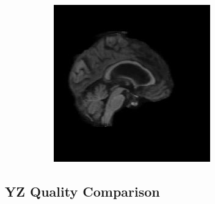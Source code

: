 \documentclass[12pt, fleqn, titlepage]{article}
\newcommand\skipperer{0.45pt}
\begin{document}
\begin{figure}[H]
\begin{subfigure}[b]{0.7\textwidth}
		\hskip\skipperer
		\includegraphics[width=0.22\linewidth]{imgs/082_S_0469/XZ_model_082_S_0469_yz_3}
	\end{subfigure}
\end{figure}

\subsection{YZ Quality Comparison}\label{yz_generated}
\end{document}
